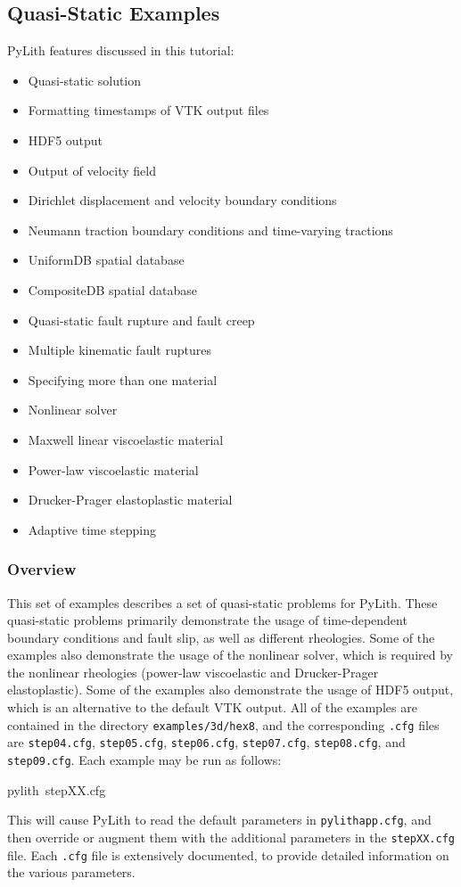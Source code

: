 
\subsection{\label{sec:Tutorial-3d-hex8-quasistatic}Quasi-Static Examples}

PyLith features discussed in this tutorial:
\begin{itemize}
\item Quasi-static solution
\item Formatting timestamps of VTK output files
\item HDF5 output
\item Output of velocity field
\item Dirichlet displacement and velocity boundary conditions
\item Neumann traction boundary conditions and time-varying tractions
\item UniformDB spatial database
\item CompositeDB spatial database
\item Quasi-static fault rupture and fault creep
\item Multiple kinematic fault ruptures
\item Specifying more than one material
\item Nonlinear solver
\item Maxwell linear viscoelastic material
\item Power-law viscoelastic material
\item Drucker-Prager elastoplastic material
\item Adaptive time stepping
\end{itemize}

\subsubsection{Overview}

This set of examples describes a set of quasi-static problems for
PyLith. These quasi-static problems primarily demonstrate the usage
of time-dependent boundary conditions and fault slip, as well as different
rheologies. Some of the examples also demonstrate the usage of the
nonlinear solver, which is required by the nonlinear rheologies (power-law
viscoelastic and Drucker-Prager elastoplastic). Some of the examples
also demonstrate the usage of HDF5 output, which is an alternative
to the default VTK output. All of the examples are contained in the
directory \texttt{examples/3d/hex8}, and the corresponding \texttt{.cfg}
files are \texttt{step04.cfg}, \texttt{step05.cfg}, \texttt{step06.cfg},
\texttt{step07.cfg}, \texttt{step08.cfg}, and \texttt{step09.cfg}.
Each example may be run as follows:
\begin{lyxcode}
pylith~stepXX.cfg
\end{lyxcode}
This will cause PyLith to read the default parameters in \texttt{pylithapp.cfg},
and then override or augment them with the additional parameters in
the \texttt{stepXX.cfg} file. Each \texttt{.cfg} file is extensively
documented, to provide detailed information on the various parameters.


